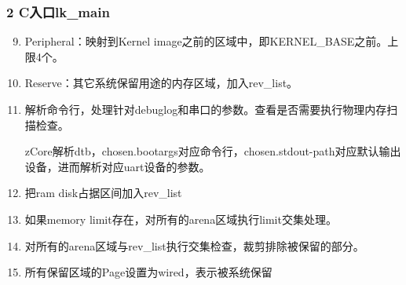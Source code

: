 \documentclass[
8pt, %
]{beamer}
\begin{document}
	\begin{frame}
		\frametitle{2 C入口lk\_main}
		\begin{enumerate}\setcounter{enumi}{8}
			\item Peripheral：映射到Kernel image之前的区域中，即KERNEL\_BASE之前。上限4个。
			\item Reserve：其它系统保留用途的内存区域，加入rev\_list。
			\item 解析命令行，处理针对debuglog和串口的参数。查看是否需要执行物理内存扫描检查。
			\begin{block}{}
				zCore解析dtb，chosen.bootargs对应命令行，chosen.stdout-path对应默认输出设备，进而解析对应uart设备的参数。
			\end{block}
			\item 把ram disk占据区间加入rev\_list
			\item 如果memory limit存在，对所有的arena区域执行limit交集处理。
			\item 对所有的arena区域与rev\_list执行交集检查，裁剪排除被保留的部分。
			\item 所有保留区域的Page设置为wired，表示被系统保留
		\end{enumerate}
	\end{frame}
\end{document}
